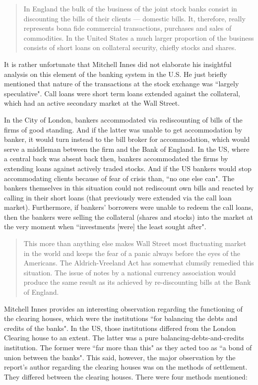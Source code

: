 \begin{quote}
In England the bulk of the business of the joint stock banks consist in discounting the bills of their clients --- domestic bills. It, therefore, really represents bona fide commercial transactions, purchases and sales of commodities. In the United States a much larger proportion of the business consists of short loans on collateral security, chiefly stocks and shares. \citep{innes1910}
\end{quote}

It is rather unfortunate that Mitchell Innes did not elaborate his insightful analysis on this element of the banking system in the U.S. He just briefly mentioned that nature of the transactions at the stock exchange was ``largely speculative". Call loans were short term loans extended against the collateral, which had an active secondary market at the Wall Street. 

In the City of London, bankers accommodated via rediscounting of bills of the firms of good standing. And if the latter was unable to get accommodation by banker, it would turn instead to the bill broker for accommodation, which would serve a middleman between the firm and the Bank of England. In the US, where a central back was absent back then, bankers accommodated the firms by extending loans against actively traded stocks. And if the US bankers would stop accommodating clients because of fear of crisis than, ``no one else can". The bankers themselves in this situation could not rediscount own bills and reacted by calling in their short loans (that previously were extended via the call loan market). Furthermore, if bankers' borrowers were unable to redeem the call loans, then the bankers were selling the collateral (shares and stocks) into the market at the very moment when ``investments [were] the least sought after".

\begin{quote}
This more than anything else makes Wall Street most fluctuating market in the world and keeps the fear of a panic always before the eyes of the Americans. The Aldrich-Vreeland Act has somewhat clumsily remedied this situation. The issue of notes by a national currency association would produce the same result as its achieved by re-discounting bills at the Bank of England. 
 \citep{innes1910}
\end{quote}

Mitchell Innes provides an interesting observation regarding the functioning of the clearing houses, which were the institutions ``for balancing the debts and credits of the banks". In the US, those institutions differed from the London Clearing house to an extent. The latter was a pure balancing-debts-and-credits institution. The former were ``far more than this" as they acted too as ``a bond of union between the banks". This said, however, the major observation by the report's author regarding the clearing houses was on the methods of settlement. They differed between the clearing houses. There were four methods mentioned:

